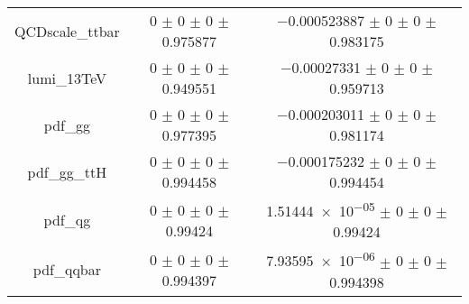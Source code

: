 \begin{table}
\begin{tabular}{ccc}
QCDscale\_ttbar & \num{0} $\pm$ \num{0} $\pm$ \num{0} $\pm$ \num{0.975877} & \num{-0.000523887} $\pm$ \num{0} $\pm$ \num{0} $\pm$ \num{0.983175}\\
lumi\_13TeV & \num{0} $\pm$ \num{0} $\pm$ \num{0} $\pm$ \num{0.949551} & \num{-0.00027331} $\pm$ \num{0} $\pm$ \num{0} $\pm$ \num{0.959713}\\
pdf\_gg & \num{0} $\pm$ \num{0} $\pm$ \num{0} $\pm$ \num{0.977395} & \num{-0.000203011} $\pm$ \num{0} $\pm$ \num{0} $\pm$ \num{0.981174}\\
pdf\_gg\_ttH & \num{0} $\pm$ \num{0} $\pm$ \num{0} $\pm$ \num{0.994458} & \num{-0.000175232} $\pm$ \num{0} $\pm$ \num{0} $\pm$ \num{0.994454}\\
pdf\_qg & \num{0} $\pm$ \num{0} $\pm$ \num{0} $\pm$ \num{0.99424} & \num{1.51444e-05} $\pm$ \num{0} $\pm$ \num{0} $\pm$ \num{0.99424}\\
pdf\_qqbar & \num{0} $\pm$ \num{0} $\pm$ \num{0} $\pm$ \num{0.994397} & \num{7.93595e-06} $\pm$ \num{0} $\pm$ \num{0} $\pm$ \num{0.994398}\\
\bottomrule
\end{tabular}
\end{table}